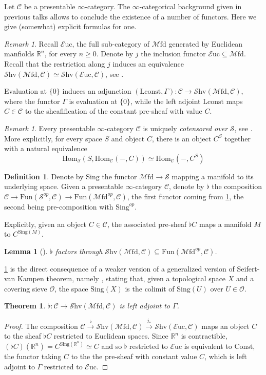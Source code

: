 \documentclass[10pt]{amsart}
\newcommand{\C}{\mathscr{C}}
\newcommand{\s}{\mathscr{S}}
\newcommand{\bR}{\mathbb{R}}
\newcommand{\Hom}{\mathrm{Hom}}
\newcommand{\Fun}{\mathrm{Fun}}
\newcommand{\Euc}{\mathscr{E}\mathrm{uc}}
\newcommand{\Mfd}{\mathscr{M}\mathrm{fd}}
\newcommand{\Shv}{\mathscr{S}\mathrm{hv}}
\newcommand{\Sing}{\mathrm{Sing}}
\newcommand{\const}{\mathrm{Lconst}}
\newtheorem{theorem}[equation]{Theorem}
\newtheorem{lemma}[equation]{Lemma}
\theoremstyle{definition}
\newtheorem{definition}[equation]{Definition}
\theoremstyle{remark}
\newtheorem{remark}[equation]{Remark}
\numberwithin{equation}{section}
\begin{document}
Let $\C$ be a presentable $\infty$-category. The $\infty$-categorical background given in previous talks allows to conclude the existence of a number of functors. Here we give (somewhat) explicit formulas for one. 
\begin{remark}
  Recall $\Euc$, the full sub-category of $\Mfd$ generated by Euclidean manfiolds $\bR^n$, for every $n\geq0$. Denote by $j$ the inclusion functor $\Euc\subseteq\Mfd$. Recall that the restriction along $j$ induces an equivalence $\Shv(\Mfd,\C)\simeq\Shv(\Euc,\C)$, see \cite[Corollary A.5.6]{amabeldebrayhaine2021diffcoh}.
\end{remark}
Evaluation at $\{0\}$ induces an adjunction $(\const,\Gamma):\C\to\Shv(\Mfd,\C)$, where the functor $\Gamma$ is evaluation at $\{0\}$, while the left adjoint $\const$ maps $C\in\C$ to the sheafification of the constant pre-sheaf with value $C$. 
\begin{remark}\label{rmk:cotensor}
Every presentable $\infty$-category $\C$ is uniquely \emph{cotensored over} $\s$, see \cite[Remark 5.5.2.6]{lurie2009htt}. More explicitly, for every space $S$ and object $C$, there is an object $C^S$ together with a natural equivalence $$\Hom_\s(S,\Hom_\C(-,C))\simeq\Hom_\C(-,C^S)$$
\end{remark}
\begin{definition}
  Denote by $\Sing$ the functor $\Mfd\to\s$ mapping a manifold to its underlying space. Given a presentable $\infty$-category $\C$, denote by $\flat$ the composition $\C\to\Fun(\s^{op},\C)\to\Fun(\Mfd^{op},\C)$, the first functor coming from \cref{rmk:cotensor}, the second being pre-composition with $\Sing^{op}$.
\end{definition}
Explicitly, given an object $C\in\C$, the associated pre-sheaf $\flat C$ maps a manifold $M$ to $C^{\Sing(M)}$. 
\begin{lemma}[{\cite[Corollary 6.46]{bunkegepner2021differential}}]\label{lem:flatsheaf}
  $\flat$ factors through $\Shv(\Mfd,\C)\subseteq\Fun(\Mfd^{op},\C)$.
\end{lemma}
\cref{lem:flatsheaf} is the direct consequence of a weaker version of a generalized version of Seifert-van Kampen theorem, namely \cite[Proposition A.3.2]{lurie2017ha}, stating that, given a topological space $X$ and a covering sieve $\mathscr{O}$, the space $\Sing(X)$ is the colimit of $\Sing(U)$ over $U\in\mathscr{O}$.
\begin{theorem}\label{thm:leftadjoint}
  $\flat:\C\to\Shv(\Mfd,\C)$ is left adjoint to $\Gamma$.
\end{theorem}
\begin{proof}
  The composition $\C\xrightarrow{\flat}\Shv(\Mfd,\C)\xrightarrow{j_*}\Shv(\Euc,\C)$ maps an object $C$ to the sheaf $\flat C$ restricted to Euclidean spaces. Since $\bR^n$ is contractible, $(\flat C)(\bR^n)=C^{\Sing(\bR^n)}\simeq C$ and so $\flat$ restricted to $\Euc$ is equivalent to $\mathrm{Const}$, the functor taking $C$ to the the pre-sheaf with constant value $C$, which is left adjoint to $\Gamma$ restricted to $\Euc$.
\end{proof}
\end{document}
